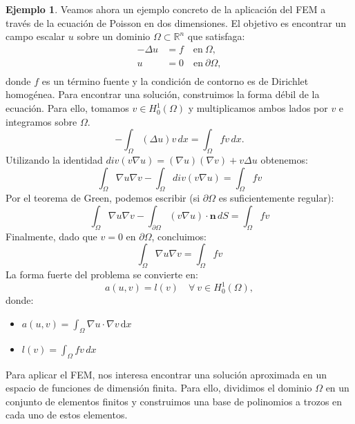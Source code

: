 \documentclass[a4paper,11pt,spanish, twoside, leqno]{tfg-uam}
\theoremstyle{definition}
\newtheorem{exmp}[teor]{Ejemplo}
\begin{document}
\begin{mdframed}  
\begin{exmp}
    Veamos ahora un ejemplo concreto de la aplicación del FEM a través de la ecuación de Poisson en dos dimensiones. El objetivo es encontrar un campo escalar $ u $ sobre un dominio $\Omega \subset \mathbb{R}^n$ que satisfaga:
    \begin{equation}
    \begin{aligned}
    - \Delta u &= f \quad \text{en} \ \Omega, \\
    u &= 0 \quad \text{en} \ \partial\Omega, \\
    \end{aligned}
    \end{equation}
    donde $ f $ es un término fuente y la condición de contorno es de Dirichlet homogénea. Para encontrar una solución, construimos la forma débil de la ecuación. Para ello, tomamos $v\in H_0^1(\Omega)$ y multiplicamos ambos lados por $v$ e integramos sobre $\Omega$.
    \begin{equation*}
        -\int_{\Omega} (\Delta u) v \, dx = \int_{\Omega} f v \, dx.
    \end{equation*}
    Utilizando la identidad $div(v\nabla u) = (\nabla u)(\nabla v) + v \Delta u$ obtenemos:
    \begin{equation*}
    \int_{\Omega} \nabla u \nabla v - \int_{\Omega} div(v \nabla u) = \int_{\Omega} f v
    \end{equation*}
    Por el teorema de Green, podemos escribir (si \(\partial \Omega\) es suficientemente regular):
    \begin{equation*}
    \int_{\Omega} \nabla u \nabla v - \int_{\partial \Omega} (v \nabla u) \cdot \mathbf{n} \, dS = \int_{\Omega} f v
    \end{equation*}
    Finalmente, dado que \(v = 0\) en \(\partial \Omega\), concluimos:
    \begin{equation*}
    \int_{\Omega} \nabla u \nabla v = \int_{\Omega} f v
    \end{equation*}
    La forma fuerte del problema se convierte en: 
    \begin{equation}\label{eq:forma_debil_poisson}
    a(u, v) = l(v) \quad \forall \ v \in H_0^1(\Omega),
    \end{equation}
    donde:
    \begin{itemize}
        \item $ a(u, v) = \int_{\Omega} \nabla u \cdot \nabla v \, \text{d}x $
        \item $ l(v) = \int_{\Omega} f v \, dx $
    \end{itemize}
    Para aplicar el FEM, nos interesa encontrar una solución aproximada en un espacio de funciones de dimensión finita. Para ello, dividimos el dominio $\Omega$ en un conjunto de elementos finitos y construimos una base de polinomios a trozos en cada uno de estos elementos. 
    

\end{exmp}
\end{mdframed}
\end{document}
